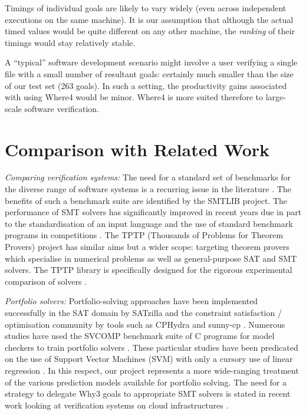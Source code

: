 \documentclass[submission,copyright,creativecommons]{eptcs}
\begin{document}
Timings of individual goals are likely to vary widely (even across independent executions on the same machine).
It is our assumption that although the actual timed values would be quite different on any other machine, the \textit{ranking} of their timings would stay relatively stable.

A ``typical'' software development scenario might involve a user verifying a single file with a small number of resultant goals: certainly much smaller than the size of our test set (263 goals). In such a setting, the productivity gains associated with using \textsf{Where4} would be minor. \textsf{Where4} is more suited therefore to large-scale software verification.


\section{Comparison with Related Work}
\label{sec:related}
\textit{Comparing verification systems:} The need for a standard set of benchmarks for the diverse range of software systems is a recurring issue in the literature \cite{Dagstuhl}. The benefits of such a benchmark suite are identified by the SMTLIB \cite{SMTLIB} project. The performance of SMT solvers has significantly improved in recent years due in part to the standardisation of an input language and the use of standard benchmark programs in  competitions \cite{SMTEVAL2013}\cite{SVCOMP}. The TPTP (Thousands of Problems for Theorem Provers) project \cite{TPTP} has similar aims but a wider scope: targeting theorem provers which specialise in numerical problems as well as general-purpose SAT and SMT solvers. The TPTP library is specifically designed for the rigorous experimental comparison of solvers \cite{Sutcliffe200139}.           

\textit{Portfolio solvers:} Portfolio-solving approaches have been implemented successfully in the SAT domain by SATzilla \cite{Satzilla} and the constraint satisfaction / optimisation community by tools such as CPHydra \cite{CPHydra} and sunny-cp \cite{sunny-cp}. Numerous studies have used the SVCOMP \cite{SVCOMP} benchmark suite of C programs for model checkers to train portfolio solvers \cite{MUX}\cite{DPVZ15:CAV}. These particular studies have been predicated on the use of Support Vector Machines (SVM) with only a cursory use of linear regression \cite{MUX}. In this respect, our project represents a more wide-ranging treatment of the various prediction models available for portfolio solving. The need for a strategy to delegate \textsf{Why3} goals to appropriate SMT solvers is stated in recent work looking at verification systems on cloud infrastructures \cite{rodinplugin}.
\end{document}
